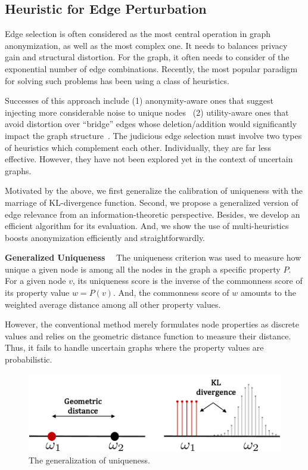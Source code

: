 \subsection{Heuristic for Edge Perturbation}
Edge selection is often considered as the most central operation in graph anonymization, as well as the most complex one. 
It needs to balances privacy gain and structural distortion. 
For the graph, it often needs to consider of the exponential number of edge combinations. 
Recently, the most popular paradigm for solving such problems has been using a class of heuristics. 

Successes of this approach include
(1) anonymity-aware ones that suggest injecting more considerable noise to unique nodes~\cite{Ying2009,Boldi_Injecting_2012,Hay_Anonymizing_2007} 
(2) utility-aware ones that avoid distortion over “bridge” edges whose deletion/addition would significantly impact the graph structure~\cite{Wang2011,Ninggal_Utility_2015}. 
The judicious edge selection must involve two types of heuristics which complement each other. 
Individually, they are far less effective. 
However, they have not been explored yet in the context of uncertain graphs.

Motivated by the above, we first generalize the calibration of uniqueness with the marriage of KL-divergence function. 
Second, we propose a generalized version of edge relevance from an information-theoretic perspective.
Besides, we develop an efficient algorithm for its evaluation.
And, we show the use of multi-heuristics boosts anonymization efficiently and straightforwardly.

\textbf{Generalized Uniqueness}~~
The uniqueness criterion was used to measure how unique a given node is among all the nodes in the graph {\wrt} a specific property $P$. 
For a given node $v$, its uniqueness score is the inverse of the commonness score of its property value $w=P(v)$.
And, the commonness score of $w$ amounts to the weighted average distance among all other property values.

However, the conventional method merely formulates node properties as discrete values and relies on the geometric distance function to measure their distance.  
Thus, it fails to handle uncertain graphs where the property values are probabilistic.

\begin{figure}[tb]
  \centering
        \includegraphics[width=\linewidth]{ill/shift_distance.pdf}
  \caption{The generalization of uniqueness.}
\end{figure}


